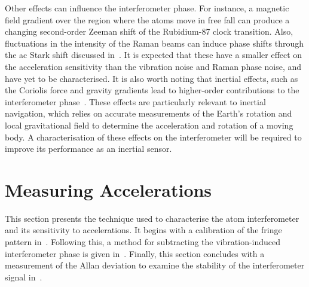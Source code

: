 \par\noindent
Other effects can influence the interferometer
phase. For instance, a magnetic field gradient over the 
region where the atoms move in free fall can produce a changing second-order Zeeman shift of
the Rubidium-87 clock transition. Also, fluctuations in the intensity of
the Raman beams can induce phase shifts through the ac Stark shift
discussed in~. It
is expected that these have a smaller effect on the acceleration
sensitivity than the vibration noise and Raman phase noise, and have yet to be
characterised. It is also worth noting that inertial effects, such as the Coriolis force and
gravity gradients lead to higher-order contributions to the
interferometer phase~\cite{Bongs2006}. These effects are particularly
relevant to inertial navigation, which relies on accurate measurements
of the Earth's rotation and local gravitational field to determine the
acceleration and rotation of a moving body. A characterisation
of these effects on the interferometer will be required to improve its
performance as an inertial sensor. 
\section{Measuring Accelerations}\label{sec:atomint_accelerations}
This section presents the technique used to characterise the atom interferometer
and its sensitivity to accelerations. It begins with a calibration of
the fringe pattern in~. Following this, a
method for subtracting the vibration-induced interferometer phase is given
in~. Finally, this section concludes with
a measurement of the Allan deviation to examine the stability of the
interferometer signal in~.
